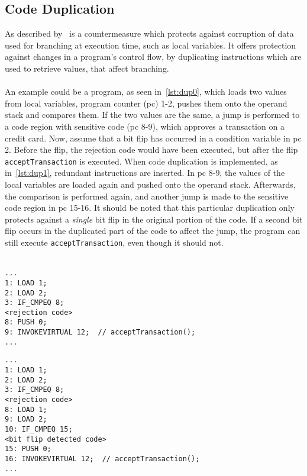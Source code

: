 \subsection{Code Duplication}
As described by~\cite{mksb} is a countermeasure which protects against corruption of data used for branching at execution time, such as local variables. It offers protection against changes in a program's control flow, by duplicating instructions which are used to retrieve values, that affect branching.\\\\
An example could be a program, as seen in~\cref{lst:dup0}, which loads two values from local variables, program counter (pc) 1-2, pushes them onto the operand stack and compares them. If the two values are the same, a jump is performed to a code region with sensitive code (pc 8-9), which approves a transaction on a credit card. Now, assume that a bit flip has occurred in a condition variable in pc 2. Before the flip, the rejection code would have been executed, but after the flip \texttt{acceptTransaction} is executed. When code duplication is implemented, as in~\cref{lst:dup1}, redundant instructions are inserted. In pc 8-9, the values of the local variables are loaded again and pushed onto the operand stack. Afterwards, the comparison is performed again, and another jump is made to the sensitive code region in pc 15-16. It should be noted that this particular duplication only protects against a \textit{single} bit flip in the original portion of the code. If a second bit flip occurs in the duplicated part of the code to affect the jump, the program can still execute \texttt{acceptTransaction}, even though it should not.\\\\

\begin{minipage}{\linewidth}
\begin{lstlisting}[caption={Original program without code duplication implemented. The code is written in \jcl.},numbers=none, label={lst:dup0}]
...
1: LOAD 1;
2: LOAD 2;
3: IF_CMPEQ 8;
<rejection code>
8: PUSH 0;
9: INVOKEVIRTUAL 12;  // acceptTransaction();
...
\end{lstlisting}
\end{minipage}

\begin{minipage}{\linewidth}
\begin{lstlisting}[caption={Modified program with code duplication implemented. The code is written in \jcl.},numbers=none, label={lst:dup1}]
...
1: LOAD 1;
2: LOAD 2;
3: IF_CMPEQ 8;
<rejection code>
8: LOAD 1;
9: LOAD 2;
10: IF_CMPEQ 15;
<bit flip detected code>
15: PUSH 0;
16: INVOKEVIRTUAL 12;  // acceptTransaction();
...
\end{lstlisting}
\end{minipage}
